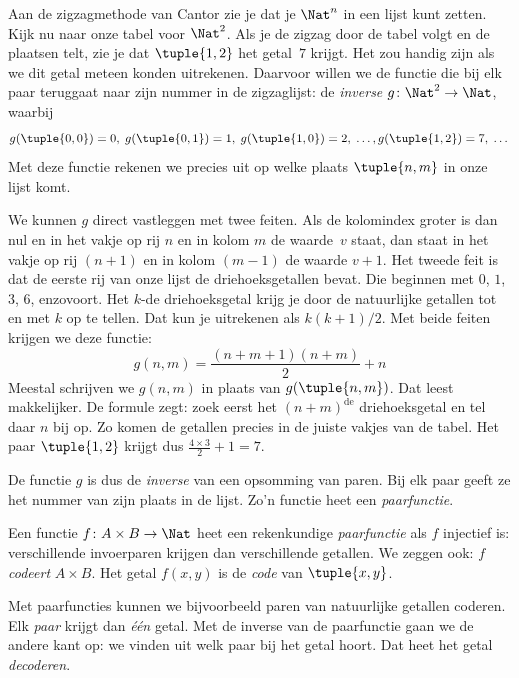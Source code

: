 \documentclass[../../../include/open-logic-section]{subfiles}
\begin{document}

\begin{explain}
Aan de zigzagmethode van Cantor zie je dat je $\Nat^n$ in een lijst kunt zetten.
Kijk nu naar onze tabel voor $\Nat^2$. Als je de zigzag door de tabel
volgt en de plaatsen telt, zie je dat $\tuple{1,2}$ het getal~$7$
krijgt. Het zou handig zijn als we dit getal meteen konden uitrekenen.
Daarvoor willen we de functie die bij elk paar teruggaat naar zijn nummer
in de zigzaglijst: de
\emph{inverse} $g\colon \Nat^2 \to \Nat$, waarbij
\[
g(\tuple{0,0}) = 0, \;
g(\tuple{0,1}) = 1, \;
g(\tuple{1,0}) = 2, \; \dots,  
g(\tuple{1,2}) = 7, \; \dots
\]
Met deze functie rekenen we precies uit op welke plaats $\tuple{n, m}$
in onze lijst komt.

We kunnen $g$ direct vastleggen met twee feiten. Als de kolomindex
groter is dan nul en in het vakje op rij $n$ en in kolom $m$ de
waarde~$v$ staat, dan staat in het vakje op
rij $(n+1)$ en in kolom $(m-1)$ de waarde $v + 1$. Het tweede feit is
dat de eerste rij van onze lijst de driehoeksgetallen bevat. Die beginnen
met $0$, $1$, $3$, $6$, enzovoort. Het $k$-de driehoeksgetal krijg je
door de natuurlijke getallen tot en met $k$ op te tellen. Dat kun je uitrekenen
als $k(k+1)/2$. Met beide feiten krijgen we deze functie:
\[
  g(n,m) = \frac{(n+m+1)(n+m)}{2} + n
\]
Meestal schrijven we $g(n, m)$ in plaats van $g(\tuple{n, m})$. Dat
leest makkelijker. De formule zegt: zoek eerst het
$(n+m)^\text{de}$ driehoeksgetal en tel daar $n$ bij op. Zo komen de
getallen precies in de juiste vakjes van de tabel. Het paar
$\tuple{1, 2}$ krijgt dus $\frac{4 \times 3}{2} + 1 = 7$.

De functie $g$ is dus de \emph{inverse} van een opsomming van paren. Bij elk
paar geeft ze het nummer van zijn plaats in de lijst.
Zo'n functie heet een \emph{paarfunctie}.
\end{explain}

\begin{defn}[Paarfunctie]
  Een functie $f\colon A \times B \to \Nat$ heet een rekenkundige
  \emph{paarfunctie} als $f$ injectief is: verschillende invoerparen
  krijgen dan verschillende getallen. We zeggen ook: $f$
  \emph{codeert} $A \times B$. Het getal $f(x,y)$ is de
  \emph{code} van $\tuple{x,y}$.
\end{defn}

\begin{explain}
Met paarfuncties kunnen we bijvoorbeeld paren van natuurlijke getallen
coderen. Elk \emph{paar} krijgt dan \emph{één} getal. Met de
inverse van de paarfunctie gaan we de andere kant op: we vinden uit welk
paar bij het getal hoort. Dat heet het getal \emph{decoderen}.
\end{explain}
\end{document}
